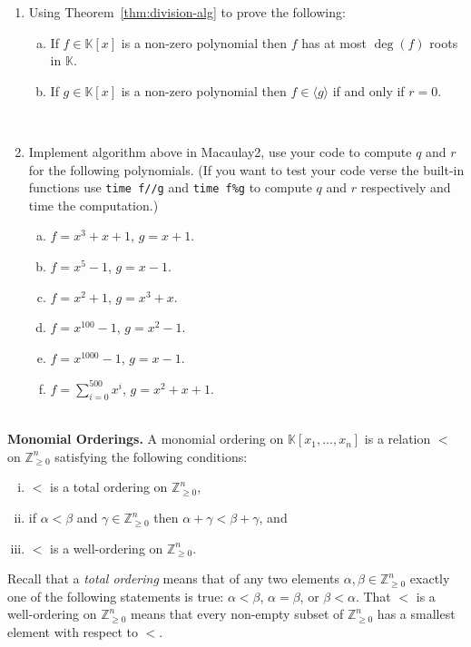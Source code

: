 \documentclass[12pt]{amsart}
\theoremstyle{definition}
\newcommand{\KK}{\mathbb{K}}
\newcommand{\ZZ}{\mathbb{Z}}
\begin{document}
\begin{enumerate}

\item Using Theorem~\ref{thm:division-alg} to prove the following:
\begin{enumerate}[(a)]
	\item If $f\in \KK[x]$ is a non-zero polynomial then $f$ has at most $\deg(f)$ roots in $\KK$.
	\item If $g\in \KK[x]$ is a non-zero polynomial then $f \in \langle g \rangle$ if and only if $r=0$. 
\end{enumerate}

\ \\


\item Implement algorithm above in Macaulay2, use your code to compute $q$ and $r$ for the following polynomials. (If you want to test your code verse the built-in functions use \verb|time f//g| and \verb|time f%g| to compute $q$ and $r$ respectively and time the computation.)
\begin{enumerate}[(a)]
	\item $f = x^3 + x + 1$, \quad $g = x + 1$.
	\item $f = x^5 - 1$, \quad $g = x - 1$.
	\item $f = x^2 + 1$, \quad $g = x^3 + x$.
	\item $f = x^{100} - 1$, \quad $g = x^2 - 1$.
	\item $f = x^{1000} - 1$, \quad $g = x - 1$.
	\item $f = \sum_{i=0}^{500} x^i$, \quad $g = x^2 + x + 1$.
\end{enumerate}

\end{enumerate}

\ \\

\noindent \textbf{Monomial Orderings.} A monomial ordering on $\KK[x_1,\ldots,x_n]$ is a relation $<$ on $\ZZ^{n}_{\geq0}$ satisfying the following conditions:
\begin{enumerate}[(i)]
\item $<$ is a total ordering on $\ZZ^{n}_{\geq0}$,
\item if $\alpha < \beta$ and $\gamma \in \ZZ^{n}_{\geq0}$ then $\alpha+\gamma < \beta + \gamma$, and
\item $<$ is a well-ordering on $\ZZ^{n}_{\geq0}$.
\end{enumerate}
Recall that a \emph{total ordering} means that of any two elements $\alpha,\beta \in \ZZ^{n}_{\geq0}$ exactly one of the following statements is true: $\alpha < \beta$, $\alpha = \beta$, or $\beta < \alpha$. That $<$ is a well-ordering on $\ZZ^{n}_{\geq0}$  means that every non-empty subset of $\ZZ^{n}_{\geq0}$ has a smallest element with respect to $<$.
\end{document}
